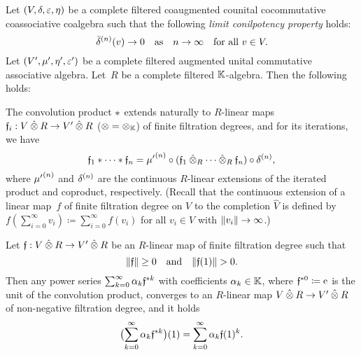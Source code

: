 \documentclass[\MainFolder/Text.tex]{subfiles}
\begin{document}
\begin{Proposition}\label{Prop:ConvPwrSer}
Let $(V,\delta,\varepsilon, \eta)$ be a complete filtered coaugmented counital cocommutative coassociative coalgebra such that the following \emph{limit conilpotency property} holds:
\begin{equation}\label{Eq:LimConilp}
\bar{\delta}^{(n)}(v) \to 0\quad\text{as}\quad n\to\infty\quad\text{for all }v\in V.
\end{equation}
Let $(V',\mu',\eta',\varepsilon')$ be a complete filtered augmented unital commutative associative algebra. Let~$R$ be a complete filtered $\mathbb{K}$-algebra. Then the following holds:
\begin{ClaimList}
\item The convolution product $*$ extends naturally to $R$-linear maps $\MVMorF_i: V\COtimes R\rightarrow V'\COtimes R$ ($\otimes = \otimes_{\mathbb{K}}$) of finite filtration degrees, and for its iterations, we have
\begin{equation}\label{Eq:ItStarProd}
\MVMorF_1\Star\dotsb\Star\MVMorF_n = {\MVProd'}^{(n)}\circ(\MVMorF_1\COtimes_R\dotsb\COtimes_R\MVMorF_n)\circ \MVCoProd^{(n)},
\end{equation}
where ${\mu'}^{(n)}$ and $\delta^{(n)}$ are the continuous $R$-linear extensions of the iterated product and coproduct, respectively. (Recall that the continuous extension of a linear map~$f$ of finite filtration degree on $V$ to the completion $\hat{V}$ is defined by $f(\sum_{i=0}^\infty v_i) \coloneqq \sum_{i=0}^\infty f(v_i)$ for all $v_i\in V$ with $\| v_i \|\to\infty$.)
\item Let $\MVMorF: V\COtimes R\rightarrow V'\COtimes R$ be an $R$-linear map of finite filtration degree such that 
\begin{equation}\label{Eq:ConditionsPowerSeries}
\Norm{\MVMorF}\ge 0\quad\text{and}\quad\Norm{\MVMorF(1)}>0.
\end{equation}
Then any power series $\sum_{k=0}^\infty \alpha_k \mathfrak{f}^{* k}$ with coefficients $\alpha_k\in \mathbb{K}$, where $\mathfrak{f}^{* 0}\coloneqq \mathrm{e}$ is the unit of the convolution product, converges to an $R$-linear map $V\COtimes R \rightarrow V'\COtimes R$ of non-negative filtration degree, and it holds
\[ \bigl(\sum_{k=0}^\infty \alpha_k \mathfrak{f}^{* k}\bigr)(1) = \sum_{k=0}^\infty \alpha_k \mathfrak{f}(1)^k. \]
\end{ClaimList}
\end{Proposition}
\end{document}
